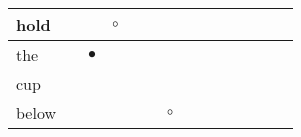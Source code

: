 \documentclass[landscape]{article}
\newcommand{\ssp}{\hspace{2pt}}
\newcommand{\mex}{\cellcolor{g}$\bullet$}
\newcommand{\map}{\cellcolor{y}$\boldsymbol\circ$}
\begin{document}
\begin{tabular}{|l|p{10pt}|p{10pt}|p{10pt}|p{10pt}|p{10pt}|p{10pt}|p{10pt}|p{10pt}|p{10pt}|p{10pt}|p{10pt}|p{10pt}|p{10pt}|}
\hline
\ssp \cellcolor{ref2}hold \ssp&\hspace{2pt}&\hspace{2pt}&\hspace{2pt}\map&\hspace{2pt}&\hspace{2pt}&\hspace{2pt}&\hspace{2pt}&\hspace{2pt}&\hspace{2pt}&\hspace{2pt}&\hspace{2pt}&\hspace{2pt}&\hspace{2pt}\\
\hline
\ssp \cellcolor{ref1}the \ssp&\hspace{2pt}&\hspace{2pt}\mex&\hspace{2pt}&\hspace{2pt}&\hspace{2pt}&\hspace{2pt}&\hspace{2pt}&\hspace{2pt}&\hspace{2pt}&\hspace{2pt}&\hspace{2pt}&\hspace{2pt}&\hspace{2pt}\\
\hline
\ssp cup \ssp&\hspace{2pt}&\hspace{2pt}&\hspace{2pt}&\hspace{2pt}&\hspace{2pt}&\hspace{2pt}&\hspace{2pt}&\hspace{2pt}&\hspace{2pt}&\hspace{2pt}&\hspace{2pt}&\hspace{2pt}&\hspace{2pt}\\
\hline
\ssp \cellcolor{ref5}below \ssp&\hspace{2pt}&\hspace{2pt}&\hspace{2pt}&\hspace{2pt}&\hspace{2pt}&\hspace{2pt}\map&\hspace{2pt}&\hspace{2pt}&\hspace{2pt}&\hspace{2pt}&\hspace{2pt}&\hspace{2pt}&\hspace{2pt}\\

\end{tabular}
\end{document}
